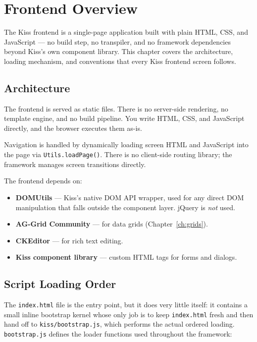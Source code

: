 \chapter{Frontend Overview}
\label{ch:frontend}

The Kiss frontend is a single-page application built with plain HTML, CSS, and JavaScript --- no build step, no transpiler, and no framework dependencies beyond Kiss's own component library.  This chapter covers the architecture, loading mechanism, and conventions that every Kiss frontend screen follows.

\section{Architecture}
\label{sec:fe-arch}

The frontend is served as static files.  There is no server-side rendering, no template engine, and no build pipeline.  You write HTML, CSS, and JavaScript directly, and the browser executes them as-is.

Navigation is handled by dynamically loading screen HTML and JavaScript into the page via \texttt{Utils.loadPage()}.  There is no client-side routing library; the framework manages screen transitions directly.

The frontend depends on:
\begin{itemize}
  \item \textbf{DOMUtils} --- Kiss's native DOM API wrapper, used for any direct DOM manipulation that falls outside the component layer.  jQuery is \emph{not} used.
  \item \textbf{AG-Grid Community} --- for data grids (Chapter~\ref{ch:grids}).
  \item \textbf{CKEditor} --- for rich text editing.
  \item \textbf{Kiss component library} --- custom HTML tags for forms and dialogs.
\end{itemize}

\section{Script Loading Order}
\label{sec:fe-loading}

The \texttt{index.html} file is the entry point, but it does very little itself: it contains a small inline bootstrap kernel whose only job is to keep \texttt{index.html} fresh and then hand off to \texttt{kiss/bootstrap.js}, which performs the actual ordered loading.  \texttt{bootstrap.js} defines the loader functions used throughout the framework:

